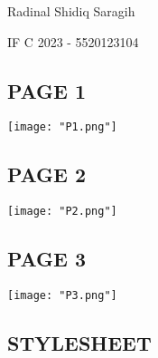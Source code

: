 \documentclass[12pt,a4paper]{article}
\date{}
\begin{document}
Radinal Shidiq Saragih

IF C 2023 - 5520123104


\begin{center}
  \section*{PAGE 1}
\end{center}

\begin{center}
  \texttt{[image: "P1.png"]}
\end{center}

%

\begin{center}
  \section*{PAGE 2}
\end{center}

\begin{center}
  \texttt{[image: "P2.png"]}
\end{center}

%

\begin{center}
  \section*{PAGE 3}
\end{center}

\begin{center}
  \texttt{[image: "P3.png"]}
\end{center}

%

\begin{center}
  \section*{STYLESHEET}
\end{center}

%
\end{document}
